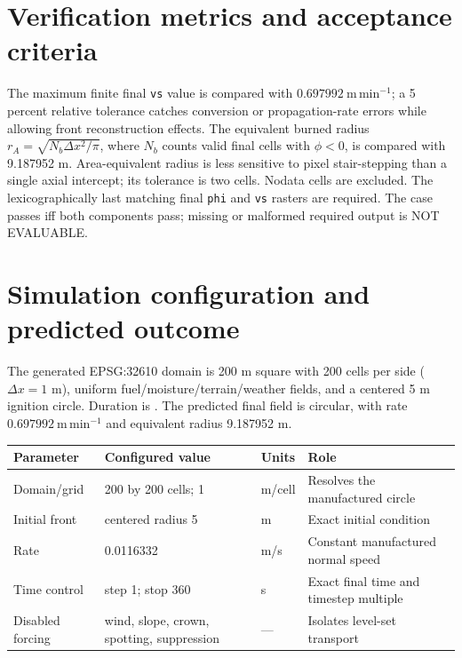 \section{Verification metrics and acceptance criteria}

The maximum finite final \texttt{vs} value is compared with \(0.697992~\mathrm{m\,min^{-1}}\); a 5 percent relative tolerance catches conversion or propagation-rate errors while allowing front reconstruction effects. The equivalent burned radius
\(r_A=\sqrt{N_b\Delta x^2/\pi}\), where \(N_b\) counts valid final cells with \(\phi<0\), is compared with 9.187952 m. Area-equivalent radius is less sensitive to pixel stair-stepping than a single axial intercept; its tolerance is two cells. Nodata cells are excluded. The lexicographically last matching final \texttt{phi} and \texttt{vs} rasters are required. The case passes iff both components pass; missing or malformed required output is NOT EVALUABLE.

\section{Simulation configuration and predicted outcome}

The generated EPSG:32610 domain is 200 m square with 200 cells per side (\(\Delta x=1\) m), uniform fuel/moisture/terrain/weather fields, and a centered 5 m ignition circle. Duration is \FinalTime. The predicted final field is circular, with rate \(0.697992~\mathrm{m\,min^{-1}}\) and equivalent radius 9.187952 m.

\begin{center}\begin{tabular}{p{}p{}p{}p{}}\toprule
Parameter & Configured value & Units & Role \\
\midrule Domain/grid & 200 by 200 cells; 1 & m/cell & Resolves the manufactured circle \\
Initial front & centered radius 5 & m & Exact initial condition \\
Rate & 0.0116332 & m/s & Constant manufactured normal speed \\
Time control & step 1; stop 360 & s & Exact final time and timestep multiple \\
Disabled forcing & wind, slope, crown, spotting, suppression & --- & Isolates level-set transport \\
\bottomrule\end{tabular}\end{center}

